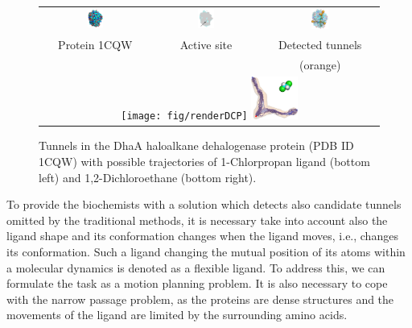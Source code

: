 \documentclass[usletter, 10pt, conference]{ieeeconf} %
\begin{document}
\begin{figure}[t]
\centering
{\footnotesize
\renewcommand{\arraystretch}{0.1}
\renewcommand{\tabcolsep}{0pt}
\begin{tabular}{ccc}
\includegraphics[width=0.15\textwidth]{fig/motiv1} &
\includegraphics[width=0.17\textwidth]{fig/motiv2lab} &
\includegraphics[width=0.16\textwidth]{fig/motiv3}  \\
Protein 1CQW & Active site & Detected tunnels \\ %
             &            & (orange)         \\  %
\multicolumn{3}{c}{%
\texttt{[image: fig/renderDCP]}  \hskip 15pt
\includegraphics[width=0.14\textwidth]{fig/render37t}} \\ 
\end{tabular}
}
\caption{\label{fig::motiv}
    Tunnels in the DhaA haloalkane dehalogenase protein (PDB ID 1CQW) with possible trajectories of 1-Chlorpropan ligand (bottom left) and 1,2-Dichloroethane (bottom right).
}
\end{figure}


To provide the biochemists with a solution which detects also candidate tunnels omitted by the traditional methods, it is necessary take into account also the ligand shape and its conformation changes when the ligand moves, i.e., changes its conformation.
Such a ligand changing the mutual position of its atoms within a molecular dynamics is denoted as a flexible ligand.
To address this, we can formulate the task as a motion planning problem.
It is also necessary to cope with the narrow passage problem, as the proteins are dense structures and the movements of the ligand are limited by the surrounding amino acids.
\end{document}
